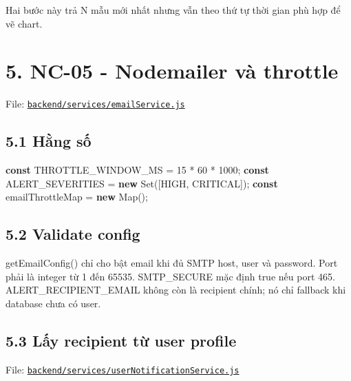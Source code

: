 \documentclass[11pt,oneside,openany]{book}
\renewcommand{\texttt}[1]{{\ttfamily\small #1}}
\newenvironment{Shaded}{\begin{snugshade}}{\end{snugshade}}
\newcommand{\BuiltInTok}[1]{\textcolor[rgb]{0.50,0.55,0.55}{#1}}
\newcommand{\DecValTok}[1]{\textcolor[rgb]{0.96,0.45,0.00}{#1}}
\newcommand{\KeywordTok}[1]{\textcolor[rgb]{0.81,0.81,0.76}{\textbf{#1}}}
\newcommand{\NormalTok}[1]{\textcolor[rgb]{0.81,0.81,0.76}{#1}}
\newcommand{\OperatorTok}[1]{\textcolor[rgb]{0.81,0.81,0.76}{#1}}
\newcommand{\StringTok}[1]{\textcolor[rgb]{0.96,0.31,0.31}{#1}}
\renewenvironment{Shaded}{%
  \def\FrameCommand{\fboxsep=8pt\colorbox{shadecolor}}%
  \MakeFramed{\advance\hsize-\width\FrameRestore}%
}{\endMakeFramed}
\begin{document}
Hai bước này trả N mẫu mới nhất nhưng vẫn theo thứ tự thời gian phù hợp
để vẽ chart.

\section{5. NC-05 - Nodemailer và
throttle}\label{5-nc-05---nodemailer-vuxe0-throttle}

File:
\href{../backend/services/emailService.js}{\nolinkurl{backend/services/emailService.js}}

\subsection{5.1 Hằng số}\label{51-hux1eb1ng-sux1ed1}

\begin{Shaded}
\begin{Highlighting}[]
\KeywordTok{const}\NormalTok{ THROTTLE\_WINDOW\_MS }\OperatorTok{=} \DecValTok{15} \OperatorTok{*} \DecValTok{60} \OperatorTok{*} \DecValTok{1000}\OperatorTok{;}
\KeywordTok{const}\NormalTok{ ALERT\_SEVERITIES }\OperatorTok{=} \KeywordTok{new} \BuiltInTok{Set}\NormalTok{([}\StringTok{\textquotesingle{}HIGH\textquotesingle{}}\OperatorTok{,} \StringTok{\textquotesingle{}CRITICAL\textquotesingle{}}\NormalTok{])}\OperatorTok{;}
\KeywordTok{const}\NormalTok{ emailThrottleMap }\OperatorTok{=} \KeywordTok{new} \BuiltInTok{Map}\NormalTok{()}\OperatorTok{;}
\end{Highlighting}
\end{Shaded}

\subsection{5.2 Validate config}\label{52-validate-config}

\texttt{getEmailConfig()} chỉ cho bật email khi đủ SMTP host, user và
password. Port phải là integer từ 1 đến 65535. \texttt{SMTP\_SECURE} mặc
định true nếu port 465. \texttt{ALERT\_RECIPIENT\_EMAIL} không còn là
recipient chính; nó chỉ fallback khi database chưa có user.

\subsection{5.3 Lấy recipient từ user
profile}\label{53-lux1ea5y-recipient-tux1eeb-user-profile}

File:
\href{../backend/services/userNotificationService.js}{\nolinkurl{backend/services/userNotificationService.js}}
\end{document}
